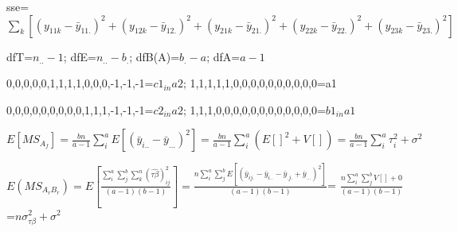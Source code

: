 \documentclass[
  10pt,
  twocolumn]{article}
\begin{document}
sse=\(\sum_k[(y_{11k}-\bar y_{11.})^2+(y_{12k}-\bar y_{12.})^2+(y_{21k}-\bar y_{21.})^2+(y_{22k}-\bar y_{22.})^2+(y_{23k}-\bar y_{23.})^2]\)

dfT=\(n_{..}-1\); dfE=\(n_{..}-b_{.}\); dfB(A)=\(b_{.}-a\); dfA=\(a-1\)

0,0,0,0,0,1,1,1,1,0,0,0,-1,-1,-1=\(c1_{in}a2\);
1,1,1,1,1,0,0,0,0,0,0,0,0,0,0=a1

0,0,0,0,0,0,0,0,0,1,1,1,-1,-1,-1=\(c2_{in}a2\);
1,1,1,0,0,0,0,0,0,0,0,0,0,0,0=\(b1_{in}a1\)

\(E[MS_{A_f}]=\frac{bn}{a-1}\sum_{i}^aE[(\bar y_{i..}-\bar y_{...})^2]=\frac{bn}{a-1}\sum_{i}^a(E[]^2+V[])=\frac{bn}{a-1}\sum_{i}^a\tau_i^2+\sigma^2\)

\(E(MS_{A_rB_r})=E[\frac{\sum_{i}^a\sum_{j}^b\sum_{k}^n(\widehat{\tau\beta})_{ij}^2}{(a-1)(b-1)}]=\frac{n\sum_{i}^a\sum_{j}^bE[(\bar y_{ij.}-\bar y_{i..}-\bar y_{.j.}+\bar y_{...})^2]}{(a-1)(b-1)}\)=
\(\frac{n\sum_{i}^a\sum_{j}^bV[]+0}{(a-1)(b-1)}\)=\(n\sigma^2_{\tau\beta}+\sigma^2\)
\end{document}
